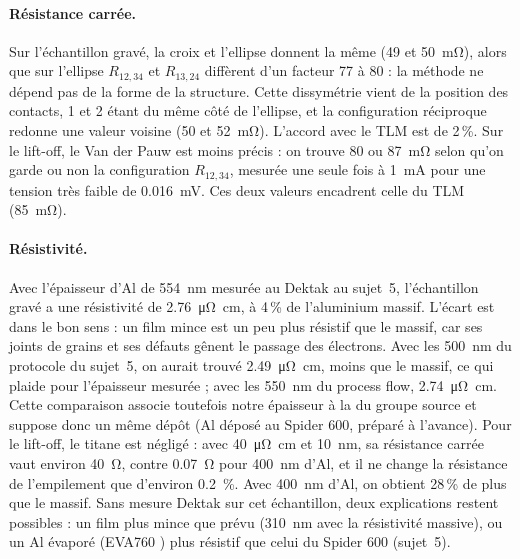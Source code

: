 \paragraph{Résistance carrée.}
Sur l'échantillon gravé, la croix et l'ellipse donnent la même \Rsq{} (49 et \qty{50}{\milli\ohm}), alors que sur l'ellipse $R_{12,34}$ et $R_{13,24}$ diffèrent d'un facteur 77 à 80 : la méthode ne dépend pas de la forme de la structure. Cette dissymétrie vient de la position des contacts, 1 et 2 étant du même côté de l'ellipse, et la configuration réciproque redonne une valeur voisine (50 et \qty{52}{\milli\ohm}). L'accord avec le TLM est de 2\,\%. Sur le lift-off, le Van der Pauw est moins précis : on trouve 80 ou \qty{87}{\milli\ohm} selon qu'on garde ou non la configuration $R_{12,34}$, mesurée une seule fois à \qty{1}{\milli\ampere} pour une tension très faible de \qty{0,016}{\milli\volt}. Ces deux valeurs encadrent celle du TLM (\qty{85}{\milli\ohm}).

\paragraph{Résistivité.}
Avec l'épaisseur d'Al de \qty{554}{\nano\metre} mesurée au Dektak au sujet~5, l'échantillon gravé a une résistivité de \qty{2,76}{\micro\ohm\centi\metre}, à 4\,\% de l'aluminium massif. L'écart est dans le bon sens : un film mince est un peu plus résistif que le massif, car ses joints de grains et ses défauts gênent le passage des électrons. Avec les \qty{500}{\nano\metre} du protocole du sujet~5, on aurait trouvé \qty{2,49}{\micro\ohm\centi\metre}, moins que le massif, ce qui plaide pour l'épaisseur mesurée ; avec les \qty{550}{\nano\metre} du process flow, \qty{2,74}{\micro\ohm\centi\metre}. Cette comparaison associe toutefois notre épaisseur à la \Rsq{} du groupe source et suppose donc un même dépôt (Al déposé au Spider 600, préparé à l'avance). Pour le lift-off, le titane est négligé : avec \qty{40}{\micro\ohm\centi\metre} \cite{prot6} et \qty{10}{\nano\metre}, sa résistance carrée vaut environ \qty{40}{\ohm}, contre \qty{0,07}{\ohm} pour \qty{400}{\nano\metre} d'Al, et il ne change la résistance de l'empilement que d'environ \qty{0,2}{\percent}. Avec \qty{400}{\nano\metre} d'Al, on obtient 28\,\% de plus que le massif. Sans mesure Dektak sur cet échantillon, deux explications restent possibles : un film plus mince que prévu (\qty{310}{\nano\metre} avec la résistivité massive), ou un Al évaporé (EVA760 \cite{prot2}) plus résistif que celui du Spider 600 (sujet~5).

